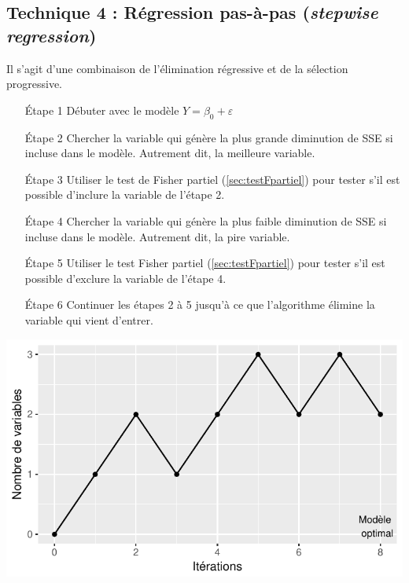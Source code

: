 \documentclass[11pt,french]{report}
\begin{document}
\subsection{Technique 4 : Régression pas-à-pas (\emph{stepwise regression})}
\label{tech4}

Il s'agit d'une combinaison de l'élimination régressive et de la sélection progressive.

\begin{itemize}
\item [Étape 1] Débuter avec le modèle $Y = \beta_0 + \varepsilon$

\item [Étape 2] Chercher la variable qui génère la plus grande diminution de SSE si incluse dans le modèle. Autrement dit, la meilleure variable.

\item [Étape 3] Utiliser le test de Fisher partiel (\ref{sec:testFpartiel}) pour tester s'il est possible d'inclure la variable de l'étape 2.

\item [Étape 4] Chercher la variable qui génère la plus faible diminution de SSE si incluse dans le modèle. Autrement dit, la pire variable.

\item [Étape 5] Utiliser le test Fisher partiel (\ref{sec:testFpartiel}) pour tester s'il est possible d'exclure la variable de l'étape 4.

\item [Étape 6] Continuer les étapes 2 à 5 jusqu'à ce que l'algorithme élimine la variable qui vient d'entrer.
\end{itemize}
\bigskip

\includegraphics{notes_de_cours-027}
\end{document}
